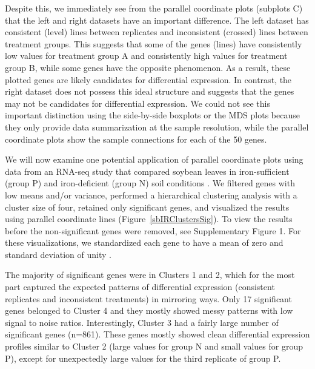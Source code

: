 \documentclass{bioinfo}
\begin{document}
Despite this, we immediately see from the parallel coordinate plots (subplots C) that the left and right datasets have an important difference. The left dataset has consistent (level) lines between replicates and inconsistent (crossed) lines between treatment groups. This suggests that some of the genes (lines) have consistently low values for treatment group A and consistently high values for treatment group B, while some genes have the opposite phenomenon. As a result, these plotted genes are likely candidates for differential expression. In contrast, the right dataset does not possess this ideal structure and suggests that the genes may not be candidates for differential expression. We could not see this important distinction using the side-by-side boxplots or the MDS plots because they only provide data summarization at the sample resolution, while the parallel coordinate plots show the sample connections for each of the 50 genes.

We will now examine one potential application of parallel coordinate plots using data from an RNA-seq study that compared soybean leaves in iron-sufficient (group P) and iron-deficient (group N) soil conditions \citep{Lauter}. We filtered genes with low means and/or variance, performed a hierarchical clustering analysis with a cluster size of four, retained only significant genes, and visualized the results using parallel coordinate lines (Figure~\ref{sbIRClustersSig}). To view the results before the non-significant genes were removed, see Supplementary Figure 1. For these visualizations, we standardized each gene to have a mean of zero and standard deviation of unity \citep{Chandrasekhar, de Souto}.

The majority of significant genes were in Clusters 1 and 2, which for the most part captured the expected patterns of differential expression (consistent replicates and inconsistent treatments) in mirroring ways. Only 17 significant genes belonged to Cluster 4 and they mostly showed messy patterns with low signal to noise ratios. Interestingly, Cluster 3 had a fairly large number of significant genes (n=861). These genes mostly showed clean differential expression profiles similar to Cluster 2 (large values for group N and small values for group P), except for unexpectedly large values for the third replicate of group P. 
\end{document}
